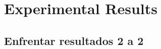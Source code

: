 
\chapter{Experimental Results} %

\label{Chapter4} %


\begin{note}
  \section{Enfrentar resultados 2 a 2}
\end{note}
